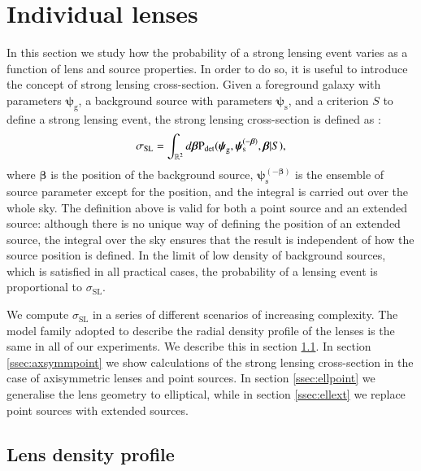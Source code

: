 \documentclass{aa}
\def\psilens{\boldsymbol{\psi}_\mathrm{g}}
\def\psisource{\boldsymbol{\psi}_\mathrm{s}}
\def\psisourcenobeta{\boldsymbol{\psi}_\mathrm{s}^{(-\boldsymbol\beta)}}
\def\pdet{{\rm P}_\mathrm{det}}
\def\crosssect{\sigma_\mathrm{{SL}}}
\begin{document}

\section{Individual lenses}\label{sect:indlenses}

In this section we study how the probability of a strong lensing event varies as a function of lens and source properties.
In order to do so, it is useful to introduce the concept of strong lensing cross-section.
Given a foreground galaxy with parameters $\psilens$, a background source with parameters $\psisource$, and a criterion $S$ to define a strong lensing event, the strong lensing cross-section is defined as \citep{Son22}:
\begin{equation}\label{eq:crosssect}
\crosssect = \int_{\mathbb{R}^2} d\boldsymbol\beta \pdet(\psilens,\psisourcenobeta,\boldsymbol\beta|S),
\end{equation}
where $\boldsymbol\beta$ is the position of the background source, $\psisourcenobeta$ is the ensemble of source parameter except for the position, and the integral is carried out over the whole sky.
The definition above is valid for both a point source and an extended source: although there is no unique way of defining the position of an extended source, the integral over the sky ensures that the result is independent of how the source position is defined.
In the limit of low density of background sources, which is satisfied in all practical cases, the probability of a lensing event is proportional to $\crosssect$.

We compute $\crosssect$ in a series of different scenarios of increasing complexity.
The model family adopted to describe the radial density profile of the lenses is the same in all of our experiments. We describe this in section \ref{ssec:profile}.
In section \ref{ssec:axsymmpoint} we show calculations of the strong lensing cross-section in the case of axisymmetric lenses and point sources.
In section \ref{ssec:ellpoint} we generalise the lens geometry to elliptical, while in section \ref{ssec:ellext} we replace point sources with extended sources.


\subsection{Lens density profile}\label{ssec:profile}
\end{document}
